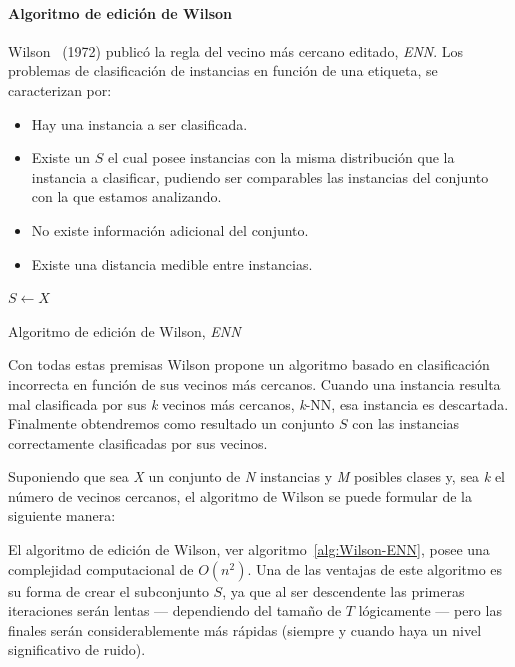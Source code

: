 \paragraph{Algoritmo de edición de Wilson}\label{paragraph:ENN}
\hfill \break
Wilson~\cite{wilson1972asymptotic} (1972) publicó la regla del vecino más cercano editado, \textit{ENN}. Los problemas de clasificación de instancias en función de una etiqueta, se caracterizan por:
\begin{itemize}
\item Hay una instancia a ser clasificada.
\item Existe un $S$ el cual posee instancias con la misma distribución que la instancia a clasificar, pudiendo ser comparables las instancias del conjunto con la que estamos analizando.
\item No existe información adicional del conjunto.
\item Existe una distancia medible entre instancias.
\end{itemize}

\begin{algorithm}[H]
  	\BlankLine
  	$S \leftarrow X$\\
  \caption{Algoritmo de edición de Wilson, \textit{ENN}}\label{alg:Wilson-ENN}
\end{algorithm}

Con todas estas premisas Wilson propone un algoritmo basado en clasificación incorrecta en función de sus vecinos más cercanos. Cuando una instancia resulta mal clasificada por sus \textit{k} vecinos más cercanos, \textit{k}-NN, esa instancia es descartada. Finalmente obtendremos como resultado un conjunto $S$ con las instancias correctamente clasificadas por sus vecinos.

Suponiendo que sea \textit{X} un conjunto de \textit{N} instancias y \textit{M} posibles clases y, sea \textit{k} el número de vecinos cercanos, el algoritmo de Wilson se puede formular de la siguiente manera:

El algoritmo de edición de Wilson, ver algoritmo~\ref{alg:Wilson-ENN}, posee una complejidad computacional de $O(n^2)$. Una de las ventajas de este algoritmo es su forma de crear el subconjunto $S$, ya que al ser descendente las primeras iteraciones serán lentas --- dependiendo del tamaño de $T$ lógicamente --- pero las finales serán considerablemente más rápidas (siempre y cuando haya un nivel significativo de ruido).


